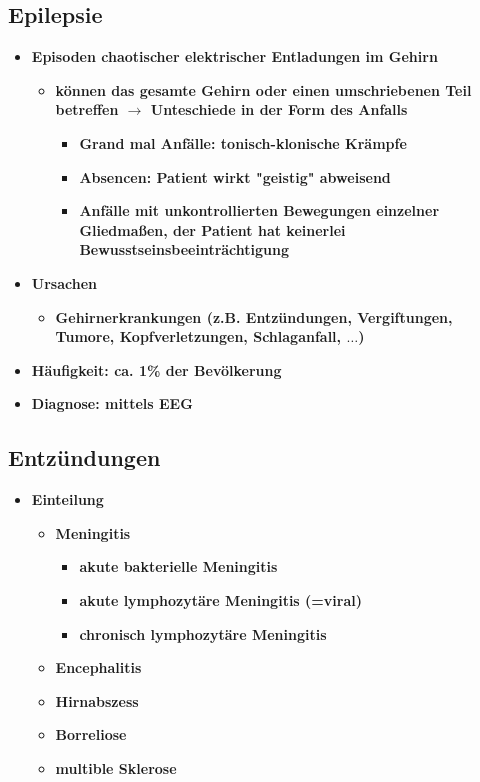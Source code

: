 	\subsection{Epilepsie}
		\begin{itemize}
			\item \textbf{Episoden chaotischer elektrischer Entladungen im Gehirn}
				\begin{itemize}
					\item \textbf{können das gesamte Gehirn oder einen umschriebenen Teil betreffen $\rightarrow$ Unteschiede in der Form des Anfalls}
						\begin{itemize}
							\item \textbf{Grand mal Anfälle: tonisch-klonische Krämpfe}
							\item \textbf{Absencen: Patient wirkt "geistig" abweisend}
							\item \textbf{Anfälle mit unkontrollierten Bewegungen einzelner Gliedmaßen, der Patient hat keinerlei Bewusstseinsbeeinträchtigung}
						\end{itemize}
				\end{itemize}
			\item \textbf{Ursachen}
				\begin{itemize}
					\item \textbf{Gehirnerkrankungen (z.B. Entzündungen, Vergiftungen, Tumore, Kopfverletzungen, Schlaganfall, $\dots$)}
				\end{itemize}
			\item \textbf{Häufigkeit: ca. 1\% der Bevölkerung}
			\item \textbf{Diagnose: mittels EEG}
		\end{itemize}
		
	\subsection{Entzündungen}
		\begin{itemize}
			\item \textbf{Einteilung}
				\begin{itemize}
					\item \textbf{Meningitis}
						\begin{itemize}
							\item \textbf{akute bakterielle Meningitis}
							\item \textbf{akute lymphozytäre Meningitis (=viral)}
							\item \textbf{chronisch lymphozytäre Meningitis}
						\end{itemize}
					\item \textbf{Encephalitis}
					\item \textbf{Hirnabszess}
					\item \textbf{Borreliose}
					\item \textbf{multible Sklerose}
				\end{itemize}
		\end{itemize}
